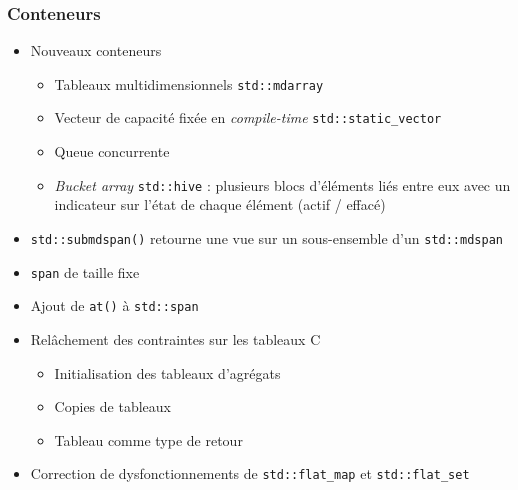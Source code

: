 \documentclass[C++.tex]{subfiles}
\begin{document}
\begin{frame}[fragile]
	\frametitle{Conteneurs}
	\begin{itemize}
		\item Nouveaux conteneurs
			\begin{itemize}
				\item Tableaux multidimensionnels \lstinline|std::mdarray|


			\item Vecteur de capacité fixée en \textit{compile-time} \lstinline|std::static_vector|


			\item Queue concurrente
			\item \textit{Bucket array} \lstinline|std::hive| : plusieurs blocs d'éléments liés entre eux avec un indicateur sur l'état de chaque élément (actif / effacé)
		\end{itemize}
		\item \lstinline|std::submdspan()| retourne une vue sur un sous-ensemble d'un \lstinline|std::mdspan|
		\item \lstinline|span| de taille fixe
		\item Ajout de \lstinline|at()| à \lstinline|std::span|
		\item Relâchement des contraintes sur les tableaux C
		\begin{itemize}
			\item Initialisation des tableaux d'agrégats
			\item Copies de tableaux
			\item Tableau comme type de retour
		\end{itemize}


		\item Correction de dysfonctionnements de \lstinline|std::flat_map| et \lstinline|std::flat_set| 
	\end{itemize}
\end{frame}
\end{document}
